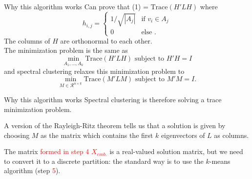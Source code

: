 \documentclass{beamer}
\begin{document}
\begin{frame}{Why this algorithm works}
    Can prove that (1) = $\textrm{Trace}(H'LH)$ where
    $$
    h_{i,j} = \begin{cases}
        1/\sqrt{|A_j|} &\textrm{if } v_i \in A_j \\
        0 &\textrm{else }.
    \end{cases}
    $$ The columns of $H$ are orthonormal to each other. \\
    The minimization problem is the same as 
    $$
    \min_{A_1, \dots, A_k} \textrm{Trace}(H'LH) \textrm{ subject to } H'H = I
    $$
    and spectral clustering relaxes this minimization problem to 
     $$
    \min_{M \in \mathcal{R}^{n \times k}} \textrm{Trace}(M'LM) \textrm{ subject to } M'M = I.
    $$
\end{frame}

\begin{frame}{Why this algorithm works}
    Spectral clustering is therefore solving a trace minimization problem. \\ \vspace{0.25cm}

    A version of the Rayleigh-Ritz theorem tells us that a solution is given by choosing $M$ as the matrix which contains the first $k$ eigenvectors of $L$ as columns. \\\vspace{0.25cm}

    The matrix \textcolor{red}{formed in step 4 $X_{emb.}$} is a real-valued solution matrix, but we need to convert it to a discrete partition: the standard way is to use the $k$-means algorithm (step \textcolor{red}{5}).
\end{frame}
\end{document}
